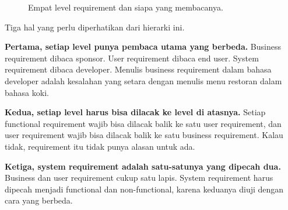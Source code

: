 \documentclass[11pt,a4paper]{article}
\begin{document}
\begin{figure}[H]
	\centering
	\caption{Empat level requirement dan siapa yang membacanya.}
	\label{fig:four-levels}
\end{figure}

Tiga hal yang perlu diperhatikan dari hierarki ini.

\textbf{Pertama, setiap level punya pembaca utama yang berbeda.} Business requirement dibaca sponsor. User requirement dibaca end user. System requirement dibaca developer. Menulis business requirement dalam bahasa developer adalah kesalahan yang setara dengan menulis menu restoran dalam bahasa koki.

\textbf{Kedua, setiap level harus bisa dilacak ke level di atasnya.} Setiap functional requirement wajib bisa dilacak balik ke satu user requirement, dan user requirement wajib bisa dilacak balik ke satu business requirement. Kalau tidak, requirement itu tidak punya alasan untuk ada.

\textbf{Ketiga, system requirement adalah satu-satunya yang dipecah dua.} Business dan user requirement cukup satu lapis. System requirement harus dipecah menjadi functional dan non-functional, karena keduanya diuji dengan cara yang berbeda.
\end{document}
